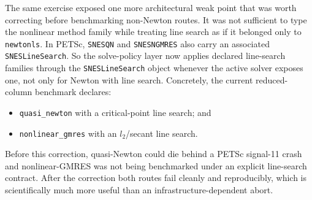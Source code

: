The same exercise exposed one more architectural weak point that was worth
correcting before benchmarking non-Newton routes.  It was not sufficient to
type the nonlinear method family while treating line search as if it belonged
only to \texttt{newtonls}.  In PETSc, \texttt{SNESQN} and
\texttt{SNESNGMRES} also carry an associated \texttt{SNESLineSearch}.  So the
solve-policy layer now applies declared line-search families through the
\texttt{SNESLineSearch} object whenever the active solver exposes one, not only
for Newton with line search.  Concretely, the current reduced-column benchmark
declares:
\begin{itemize}
  \item \texttt{quasi\_newton} with a critical-point line search; and
  \item \texttt{nonlinear\_gmres} with an \(l_2\)/secant line search.
\end{itemize}
Before this correction, quasi-Newton could die behind a PETSc signal-11 crash
and nonlinear-GMRES was not being benchmarked under an explicit line-search
contract.  After the correction both routes fail cleanly and reproducibly,
which is scientifically much more useful than an infrastructure-dependent
abort.

